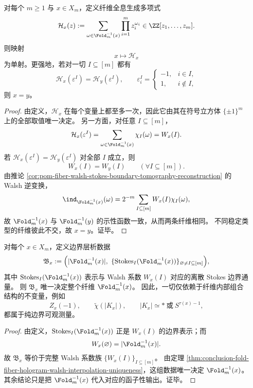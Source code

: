 \begin{theorem}\label{thm:conclusion-fold-fiber-hologram-walsh-interpolation-uniqueness}
对每个 \(m\ge 1\) 与 \(x\in X_m\)，定义纤维全息生成多项式
\[
\mathcal H_x(z):=\sum_{\omega\in \Fold_m^{-1}(x)}\prod_{i=1}^{m}z_i^{\omega_i}\in \ZZ[z_1,\dots,z_m].
\]
则映射
\[
x\longmapsto \mathcal H_x
\]
为单射。更强地，若对一切 \(I\subseteq [m]\) 都有
\[
\mathcal H_x(\varepsilon^I)=\mathcal H_y(\varepsilon^I),
\qquad
\varepsilon_i^I=
\begin{cases}
-1,& i\in I,\\
1,& i\notin I,
\end{cases}
\]
则 \(x=y\)。
\end{theorem}
\begin{proof}
由定义，\(\mathcal H_x\) 在每个变量上都至多一次，因此它由其在符号立方体 \(\{\pm 1\}^m\) 上的全部取值唯一决定。
另一方面，对任意 \(I\subseteq [m]\)，
\[
\mathcal H_x(\varepsilon^I)
=
\sum_{\omega\in \Fold_m^{-1}(x)}\chi_I(\omega)
=
W_x(I).
\]
若 \(\mathcal H_x(\varepsilon^I)=\mathcal H_y(\varepsilon^I)\) 对全部 \(I\) 成立，则
\[
W_x(I)=W_y(I)\qquad (\forall I\subseteq [m]).
\]
由推论 \ref{cor:pom-fiber-walsh-stokes-boundary-tomography-reconstruction} 的 Walsh 逆变换，
\[
\ind_{\Fold_m^{-1}(x)}(\omega)
=
2^{-m}\sum_{I\subseteq [m]}W_x(I)\chi_I(\omega),
\]
故 \(\Fold_m^{-1}(x)\) 与 \(\Fold_m^{-1}(y)\) 的示性函数一致，从而两条纤维相同。
不同稳定类型的纤维彼此不交，故 \(x=y\)。证毕。
\end{proof}

\begin{theorem}\label{thm:conclusion-fold-boundary-walsh-stokes-complete-tomography}
对每个 \(x\in X_m\)，定义边界层析数据
\[
\mathfrak B_x:=
\Bigl(
|\Fold_m^{-1}(x)|,\ 
\{\mathrm{Stokes}_I(\Fold_m^{-1}(x))\}_{\varnothing\neq I\subseteq [m]}
\Bigr),
\]
其中 \(\mathrm{Stokes}_I(\Fold_m^{-1}(x))\) 表示与 Walsh 系数 \(W_x(I)\) 对应的离散 Stokes 边界通量。
则 \(\mathfrak B_x\) 唯一决定整个纤维 \(\Fold_m^{-1}(x)\)。
因此，一切仅依赖于纤维内部组合结构的不变量，例如
\[
Z_x(-1),\qquad \widetilde\chi(|K_x|),\qquad |K_x|\simeq *\ \text{或}\ S^{\tau(x)-1},
\]
都属于纯边界可观测量。
\end{theorem}
\begin{proof}
由定义，\(\mathrm{Stokes}_I(\Fold_m^{-1}(x))\) 正是 \(W_x(I)\) 的边界表示；而
\[
W_x(\varnothing)=|\Fold_m^{-1}(x)|.
\]
故 \(\mathfrak B_x\) 等价于完整 Walsh 系数族 \(\{W_x(I)\}_{I\subseteq [m]}\)。
由定理 \ref{thm:conclusion-fold-fiber-hologram-walsh-interpolation-uniqueness}，这组数据唯一决定 \(\Fold_m^{-1}(x)\)。
其余结论只是把 \(\Fold_m^{-1}(x)\) 代入对应的函子性输出。证毕。
\end{proof}

